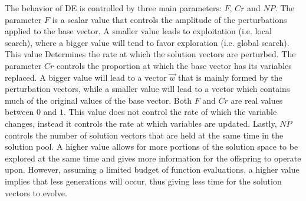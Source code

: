 The behavior of \ac{DE} is controlled by three main parameters: $F$, $Cr$ and $NP$.
The parameter $F$ is a scalar value that controls the amplitude of the perturbations applied
to the base vector. A smaller value leads to exploitation (i.e. local search), where
a bigger value will tend to favor exploration (i.e. global search). This value
Determines the rate at which the solution vectors are perturbed.
The parameter $Cr$ controls the proportion at which the base vector has its variables replaced.
A bigger value will lead to a vector $\Vec{w}$ that is mainly formed by the perturbation
vectors, while a smaller value will lead to a vector which contains much of the original values
of the base vector. Both $F$ and $Cr$ are real values between $0$ and $1$. This
value does not control the rate of which the variable changes, instead it controls the
rate at which variables are updated. Lastly, $NP$ controls the number of solution
vectors that are held at the same time in the solution pool. A higher value
allows for more portions of the solution space to be explored at the same time and gives
more information for the offspring to operate upon. However, assuming a limited 
budget of function evaluations, a higher value implies that less generations will occur,
thus giving less time for the solution vectors to evolve.



